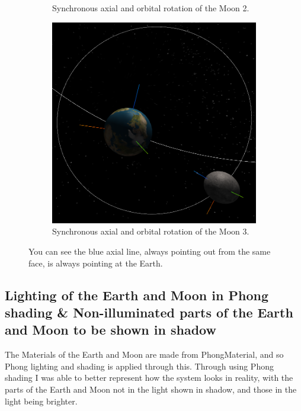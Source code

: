 \documentclass[12pt]{article}
\begin{document}
\begin{figure}[H]
\begin{subfigure}[b]{0.38\textwidth}
                \caption{Synchronous axial and orbital rotation of the Moon 2.}
                \label{fig: Synchronous axial and orbital rotation of the Moon.}
	 \end{subfigure}
	 \begin{subfigure}[b]{0.38\textwidth}
                \includegraphics[width=\textwidth]{images/syncrotation3}
                \caption{Synchronous axial and orbital rotation of the Moon 3.}
                \label{fig: Synchronous axial and orbital rotation of the Moon.}
	 \end{subfigure}
	 \caption{You can see the blue axial line, always pointing out from the same face, is always pointing at the Earth.}
\end{figure}

\subsection{Lighting of the Earth and Moon in Phong shading \& Non-illuminated parts of the Earth and Moon to be shown in shadow}
The Materials of the Earth and Moon are made from PhongMaterial, and so Phong lighting and shading is applied through this. Through using Phong shading I was able to better represent how the system looks in reality, with the parts of the Earth and Moon not in the light shown in shadow, and those in the light being brighter.
\end{document}
